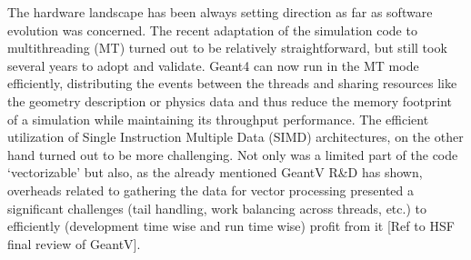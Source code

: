 \documentclass[11pt,a4paper]{article}
\begin{document}
The hardware landscape has been always setting direction as far as
software evolution was concerned. The recent adaptation of the
simulation code to multithreading (MT) turned out to be relatively
straightforward, but still took several years to adopt and validate.
Geant4 can now run in the MT mode efficiently, distributing the events
between the threads and sharing resources like the geometry description
or physics data and thus reduce the memory footprint of a simulation
while maintaining its throughput performance. The efficient utilization
of Single Instruction Multiple Data (SIMD) architectures, on the other
hand turned out to be more challenging. Not only was a limited part of
the code `vectorizable' but also, as the already mentioned GeantV R\&D
has shown, overheads related to gathering the data for vector processing
presented a significant challenges (tail handling, work balancing across
threads, etc.) to efficiently (development time wise and run time wise)
profit from it {[}Ref to HSF final review of GeantV{]}.
\end{document}
